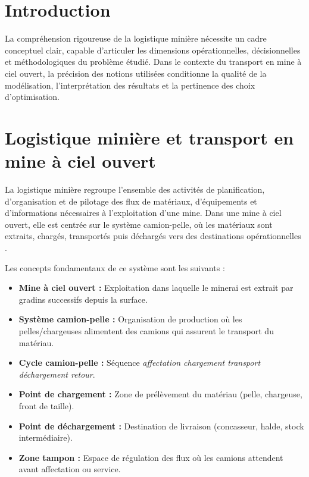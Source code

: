 \documentclass[11pt,a4paper]{report}
\begin{document}
\section*{Introduction}

La compréhension rigoureuse de la logistique minière nécessite un cadre conceptuel clair, capable d'articuler les dimensions opérationnelles, décisionnelles et méthodologiques du problème étudié. Dans le contexte du transport en mine à ciel ouvert, la précision des notions utilisées conditionne la qualité de la modélisation, l'interprétation des résultats et la pertinence des choix d'optimisation.

\section{Logistique minière et transport en mine à ciel ouvert}
\label{sec:logistique-miniere}

La logistique minière regroupe l'ensemble des activités de planification, d'organisation et de pilotage des flux de matériaux, d'équipements et d'informations nécessaires à l'exploitation d'une mine. Dans une mine à ciel ouvert, elle est centrée sur le système camion-pelle, où les matériaux sont extraits, chargés, transportés puis déchargés vers des destinations opérationnelles \cite{AlexandraMNewman2010, Afrapoli2017}.

Les concepts fondamentaux de ce système sont les suivants :
\begin{itemize}
    \item \textbf{Mine à ciel ouvert :} Exploitation dans laquelle le minerai est extrait par gradins successifs depuis la surface.
    \item \textbf{Système camion-pelle :} Organisation de production où les pelles/chargeuses alimentent des camions qui assurent le transport du matériau.
    \item \textbf{Cycle camion-pelle :} Séquence \textit{affectation \textrightarrow chargement \textrightarrow transport \textrightarrow déchargement \textrightarrow retour}.
    \item \textbf{Point de chargement :} Zone de prélèvement du matériau (pelle, chargeuse, front de taille).
    \item \textbf{Point de déchargement :} Destination de livraison (concasseur, halde, stock intermédiaire).
    \item \textbf{Zone tampon :} Espace de régulation des flux où les camions attendent avant affectation ou service.
\end{itemize}
\end{document}
